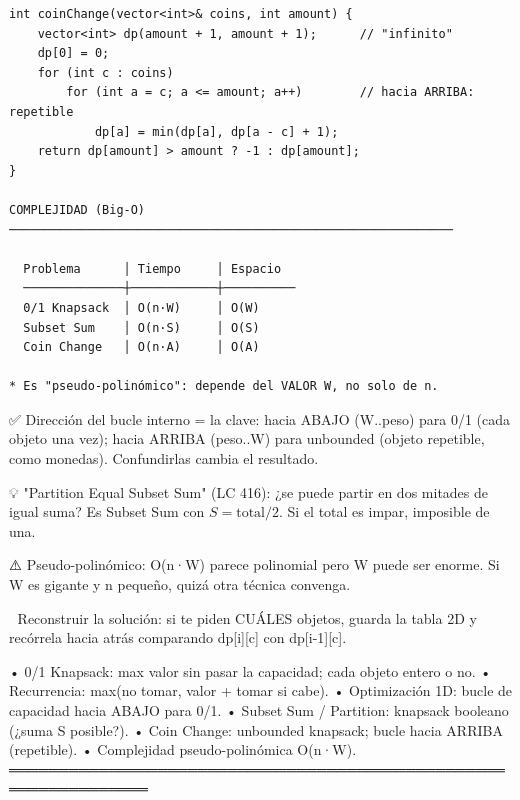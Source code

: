 \begin{lstlisting}
int coinChange(vector<int>& coins, int amount) {
    vector<int> dp(amount + 1, amount + 1);      // "infinito"
    dp[0] = 0;
    for (int c : coins)
        for (int a = c; a <= amount; a++)        // hacia ARRIBA: repetible
            dp[a] = min(dp[a], dp[a - c] + 1);
    return dp[amount] > amount ? -1 : dp[amount];
}

COMPLEJIDAD (Big-O)
──────────────────────────────────────────────────────────────

  Problema      │ Tiempo     │ Espacio
  ──────────────┼────────────┼──────────
  0/1 Knapsack  │ O(n·W)     │ O(W)
  Subset Sum    │ O(n·S)     │ O(S)
  Coin Change   │ O(n·A)     │ O(A)

* Es "pseudo-polinómico": depende del VALOR W, no solo de n.
\end{lstlisting}

\begin{dsaentrevistas}

✅ Dirección del bucle interno = la clave: hacia ABAJO (W..peso) para
   0/1 (cada objeto una vez); hacia ARRIBA (peso..W) para unbounded
   (objeto repetible, como monedas). Confundirlas cambia el resultado.

💡 "Partition Equal Subset Sum" (LC 416): ¿se puede partir en dos mitades
   de igual suma? Es Subset Sum con $S = \mathrm{total}/2$. Si el total es
   impar, imposible de una.

⚠️ Pseudo-polinómico: O(n·W) parece polinomial pero W puede ser enorme.
   Si W es gigante y n pequeño, quizá otra técnica convenga.

🔑 Reconstruir la solución: si te piden CUÁLES objetos, guarda la tabla
   2D y recórrela hacia atrás comparando dp[i][c] con dp[i-1][c].

\end{dsaentrevistas}

\begin{dsaresumen}

• 0/1 Knapsack: max valor sin pasar la capacidad; cada objeto entero o no.
• Recurrencia: max(no tomar, valor + tomar si cabe).
• Optimización 1D: bucle de capacidad hacia ABAJO para 0/1.
• Subset Sum / Partition: knapsack booleano (¿suma S posible?).
• Coin Change: unbounded knapsack; bucle hacia ARRIBA (repetible).
• Complejidad pseudo-polinómica O(n·W).
════════════════════════════════════════════════════════════════

\end{dsaresumen}
